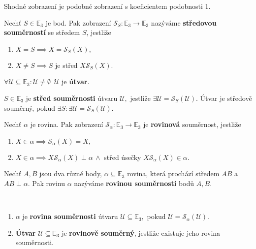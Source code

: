 \begin{pozn}
    Shodné zobrazení je podobné zobrazení s koeficientem podobnosti 1.
\end{pozn}

\begin{definition}
    Nechť $S\in \mathbb E_3$ je bod. Pak zobrazení $\mathscr S_S: \mathbb E_3 \to
    \mathbb E_3$ nazýváme \textbf{středovou souměrností} se středem $S$, jestliže
    \begin{enumerate}[$i.$]
    \item $X=S\implies X=\mathscr S_S(X),$
   	\item $X\ne S \implies S$ je střed $X\mathscr S_S(X).$
    \end{enumerate}
\end{definition}

\begin{definition}
    $\forall \mathscr U \subseteq \mathbb E_3: \mathscr U\ne \emptyset \,\,\, \mathscr
    U$ je \textbf{útvar}.
\end{definition}

\begin{definition}
    $S\in \mathbb E_3$ je \textbf{střed souměrnosti} útvaru $\mathscr U,$ jestliže
    $\exists \mathscr U = \mathscr S_S(\mathscr U).$ Útvar je středově souměrný,
    pokud $\exists S:\exists\mathscr U = \mathscr S_S(\mathscr U).$
\end{definition}

\begin{definition}
    Nechť $\alpha$ je rovina. Pak zobrazení $\mathscr S_\alpha:\mathbb E_3 \to
    \mathbb E_3$ je \textbf{rovinová}  souměrnost, jestliže
    \begin{enumerate}[$i.$]
    \item $X\in\alpha\implies \mathscr S_\alpha(X)=X,$
   	\item $X\in\alpha\implies X\mathscr S_\alpha(X) \perp\alpha\,\land$ střed úsečky
    $X\mathscr S_\alpha(X)\in \alpha.$
    \end{enumerate}
\end{definition}

\begin{definition}
    Nechť $A,B$ jsou dva různé body, $\alpha \subseteq \mathbb E_3$ rovina, která
    prochází středem $AB$ a $AB\perp \alpha$. Pak rovinu $\alpha$ nazýváme
    \textbf{rovinou souměrnosti} bodů $A,B.$
\end{definition}

\begin{definition}\,
\begin{enumerate}[$i.$]
\item $\alpha$ je \textbf{rovina souměrnosti} útvaru $\mathscr U\subseteq \mathbb E_3,$
pokud $\mathscr U = \mathscr S_\alpha(\mathscr U).$
\item \textbf{Útvar} $\mathscr U \subseteq \mathbb E_3$ je \textbf{rovinově souměrný},
jestliže existuje jeho rovina souměrnosti.
\end{enumerate}
\end{definition}

